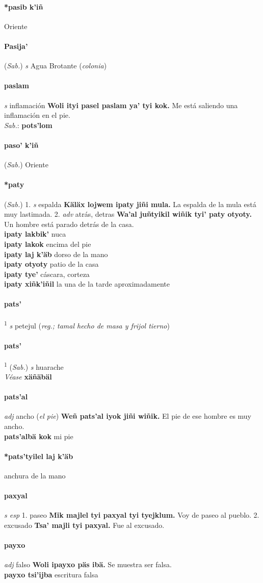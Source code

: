 \documentclass{scrbook}
\newcommand{\entry}[1]{\paragraph{#1}}
\newcommand{\onedefinition}[1]{#1.}
\newcommand{\defsuperscript}[1]{\textsuperscript{1}}
\newcommand{\partofspeech}[1]{\textit{#1}}
\newcommand{\spanishtranslation}[1]{#1}
\newcommand{\clarification}[1]{(\textit{#1})}
\newcommand{\cholexample}[1]{\textbf{#1}}
\newcommand{\exampletranslation}[1]{#1}
\newcommand{\dialectvariant}[1]{\\\textit{#1}:}
\newcommand{\dialectword}[1]{\textbf{#1}}
\newcommand{\alsosee}[1]{\\\textit{Véase} \textbf{#1}}
\newcommand{\relevantdialect}[1]{(\textit{#1})}
\newcommand{\secondaryentry}[1]{\\\textbf{#1}}
\newcommand{\secondtranslation}[1]{#1}
\begin{document}
\begin{multicols}{2}
\entry{*pasib k'iñ}
\spanishtranslation{Oriente}

\entry{Pasija'}
\relevantdialect{Sab.}
\partofspeech{s}
\spanishtranslation{Agua Brotante}
\clarification{colonia}

\entry{paslam}
\partofspeech{s}
\spanishtranslation{inflamación}
\cholexample{Woli ityi pasel paslam ya' tyi kok.}
\exampletranslation{Me está saliendo una inflamación en el pie.}
\dialectvariant{Sab.}
\dialectword{pots'lom}

\entry{paso' k'iñ}
\relevantdialect{Sab.}
\spanishtranslation{Oriente}

\entry{*paty}
\relevantdialect{Sab.}
\onedefinition{1}
\partofspeech{s}
\spanishtranslation{espalda}
\cholexample{Käläx lojwem ipaty jiñi mula.}
\exampletranslation{La espalda de la mula está muy lastimada.}
\onedefinition{2}
\partofspeech{adv}
\spanishtranslation{atrás, detras}
\cholexample{Wa'al juñtyikil wiñik tyi' paty otyoty.}
\exampletranslation{Un hombre está parado detrás de la casa.}
\secondaryentry{ipaty lakbik'}
\secondtranslation{nuca}
\secondaryentry{ipaty lakok}
\secondtranslation{encima del pie}
\secondaryentry{ipaty laj k'äb}
\secondtranslation{dorso de la mano}
\secondaryentry{ipaty otyoty}
\secondtranslation{patio de la casa}
\secondaryentry{ipaty tye'}
\secondtranslation{cáscara, corteza}
\secondaryentry{ipaty xiñk'iñil}
\secondtranslation{la una de la tarde aproximadamente}

\entry{pats'}
\defsuperscript{1}
\partofspeech{s}
\spanishtranslation{petejul}
\clarification{reg.; tamal hecho de masa y frijol tierno}

\entry{pats'}
\defsuperscript{2}
\relevantdialect{Sab.}
\partofspeech{s}
\spanishtranslation{huarache}
\alsosee{xäñäbäl}

\entry{pats'al}
\partofspeech{adj}
\spanishtranslation{ancho}
\clarification{el pie}
\cholexample{Weñ pats'al iyok jiñi wiñik.}
\exampletranslation{El pie de ese hombre es muy ancho.}
\secondaryentry{pats'albä kok}
\secondtranslation{mi pie}

\entry{*pats'tyilel laj k'äb}
\spanishtranslation{anchura de la mano}

\entry{paxyal}
\partofspeech{s esp}
\onedefinition{1}
\spanishtranslation{paseo}
\cholexample{Mik majlel tyi paxyal tyi tyejklum.}
\exampletranslation{Voy de paseo al pueblo.}
\onedefinition{2}
\spanishtranslation{excusado}
\cholexample{Tsa' majli tyi paxyal.}
\exampletranslation{Fue al excusado.}

\entry{payxo}
\partofspeech{adj}
\spanishtranslation{falso}
\cholexample{Woli ipayxo päs ibä.}
\exampletranslation{Se muestra ser falsa.}
\secondaryentry{payxo tsi'ijba}
\secondtranslation{escritura falsa}


\end{multicols}
\end{document}

